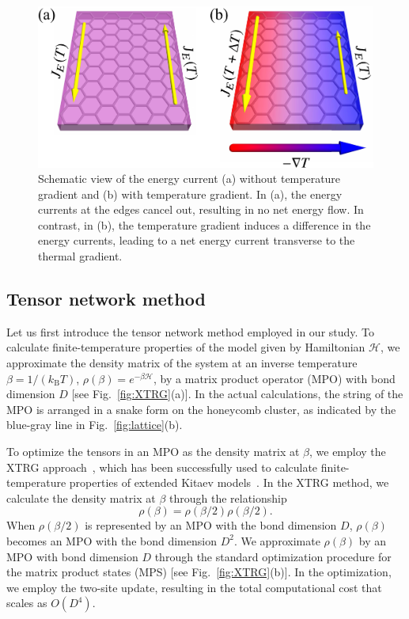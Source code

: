 \documentclass[twocolumn,superscriptaddress,showpacs, longbibliography, aps, prx]{revtex4-2}
\begin{document}
\begin{figure}[tbh]
  \begin{center}
    \includegraphics[width=\linewidth]{Figs/ThermalHall.pdf}    
  \end{center}
  \caption{
    Schematic view of the energy current (a) without temperature gradient and (b) with temperature gradient. 
    In (a), the energy currents at the edges cancel out, resulting in no net energy flow. 
    In contrast, in (b), the temperature gradient induces a difference in the energy currents, leading to a net energy current transverse to the thermal gradient.
  }
  \label{fig:ThermalHall}
\end{figure}


\subsection{Tensor network method}\label{subsec:Tensor network method}
Let us first introduce the tensor network method employed in our study. 
To calculate finite-temperature properties of the model given by Hamiltonian $\mathcal{H}$, we approximate the density matrix of the system at an inverse temperature $\beta = 1/(k_{\mathrm{B}} T)$, $\rho(\beta) = e^{-\beta\mathcal{H}}$, by a matrix product operator (MPO) with bond dimension $D$ [see Fig.~\ref{fig:XTRG}(a)]. In the actual calculations, the string of the MPO is arranged in a snake form on the honeycomb cluster, as indicated by the blue-gray line in Fig.~\ref{fig:lattice}(b). 

To optimize the tensors in an MPO as the density matrix at $\beta$, 
we employ the XTRG approach~\cite{Chen2018}, which has been successfully used to calculate finite-temperature properties of extended Kitaev models~\cite{Li2020, LiZWWGQLGL2021}. 
In the XTRG method, we calculate the density matrix at $\beta$ through the relationship
\begin{equation}
  \rho(\beta)=\rho(\beta/2)\rho(\beta/2).
\end{equation}
When $\rho(\beta/2)$ is represented by an MPO with the bond dimension $D$, $\rho(\beta)$ becomes an MPO with the bond dimension $D^2$. 
We approximate $\rho(\beta)$ by an MPO with bond dimension $D$ through the standard optimization procedure for the matrix product states (MPS) \cite{Chen2018} [see Fig.~\ref{fig:XTRG}(b)]. 
In the optimization, we employ the two-site update, resulting in the total computational cost that scales as $O(D^4)$. 
\end{document}
